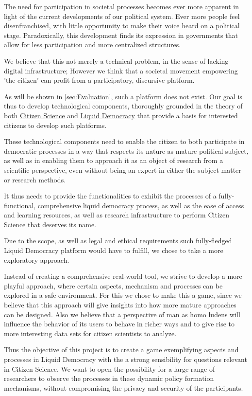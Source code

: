 The need for participation in societal processes becomes ever more apparent in light of the current developments of our political system. Ever more people feel disenfranchised, with little opportunity to make their voice heard on a political stage. Paradoxically, this development finds its expression in governments that allow for less participation and more centralized structures.

We believe that this not merely a technical problem, in the sense of lacking digital infrastructure; However we think that a societal movement empowering 'the citizen' can profit from a participatory, discursive platform.

As will be shown in \ref{sec:Evaluation}, such a platform does not exist. Our goal is thus to develop technological components, thoroughly grounded in the theory of both \href{sec:Theory_CS}{Citizen Science} and \href{sec:Theory_LD}{Liquid Democracy} that provide a basis for interested citizens to develop such platforms.

These technological components need to enable the citizen to both participate in democratic processes in a way that respects its nature as mature political subject, as well as in enabling them to approach it as an object of research from a scientific perspective, even without being an expert in either the subject matter or research methods. 

It thus needs to provide the functionalities to exhibit the processes of a fully-functional, comprehensive liquid democracy process, as well as the ease of access and learning resources, as well as research infrastructure to perform Citizen Science that deserves its name.

Due to the scope, as well as legal and ethical requirements such fully-fledged Liquid Democracy platform would have to fulfill, we chose to take a more exploratory approach. 

Instead of creating a comprehensive real-world tool, we strive to develop a more playful approach, where certain aspects, mechanism and processes can be explored in a safe environment. For this we chose to make this a game, since we believe that this approach will give insights into how more mature approaches can be designed. Also we believe that a perspective of man as homo ludens will influence the behavior of its users to behave in richer ways and to give rise to more interesting data sets for citizen scientists to analyze.

Thus the objective of this project is to create a game exemplifying aspects and processes in Liquid Democracy with the a strong sensibility for questions relevant in Citizen Science. We want to open the possibility for a large range of researchers to observe the processes in these dynamic policy formation mechanisms, without compromising the privacy and security of the participants.

